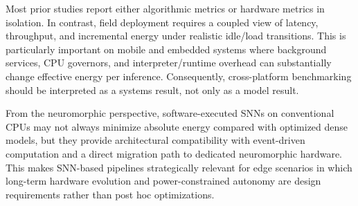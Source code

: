 Most prior studies report either algorithmic metrics or hardware metrics in isolation. In contrast, field deployment requires a coupled view of latency, throughput, and incremental energy under realistic idle/load transitions. This is particularly important on mobile and embedded systems where background services, CPU governors, and interpreter/runtime overhead can substantially change effective energy per inference. Consequently, cross-platform benchmarking should be interpreted as a systems result, not only as a model result.

From the neuromorphic perspective, software-executed SNNs on conventional CPUs may not always minimize absolute energy compared with optimized dense models, but they provide architectural compatibility with event-driven computation and a direct migration path to dedicated neuromorphic hardware. This makes SNN-based pipelines strategically relevant for edge scenarios in which long-term hardware evolution and power-constrained autonomy are design requirements rather than post hoc optimizations.

